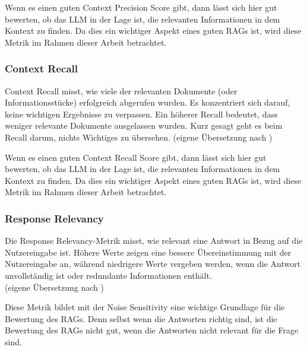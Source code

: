 Wenn es einen guten Context Precision Score gibt, dann lässt sich hier gut bewerten, ob das LLM in der Lage ist, die relevanten Informationen in dem Kontext zu finden.
Da dies ein wichtiger Aspekt eines guten RAGs ist, wird diese Metrik im Rahmen dieser Arbeit betrachtet.

\subsubsection{Context Recall}
\begin{plainquote}
Context Recall misst, wie viele der relevanten Dokumente (oder Informationsstücke) erfolgreich abgerufen wurden.
Es konzentriert sich darauf, keine wichtigen Ergebnisse zu verpassen.
Ein höherer Recall bedeutet, dass weniger relevante Dokumente ausgelassen wurden.
Kurz gesagt geht es beim Recall darum, nichts Wichtiges zu übersehen.
(eigene Übersetzung nach \cite{ragas_context_recall})
\end{plainquote}

Wenn es einen guten Context Recall Score gibt, dann lässt sich hier gut bewerten, ob das LLM in der Lage ist, die relevanten Informationen in dem Kontext zu finden.
Da dies ein wichtiger Aspekt eines guten RAGs ist, wird diese Metrik im Rahmen dieser Arbeit betrachtet.

\subsubsection{Response Relevancy}
\begin{plainquote}
Die Response Relevancy-Metrik misst, wie relevant eine Antwort in Bezug auf die Nutzereingabe ist. Höhere Werte zeigen eine bessere Übereinstimmung mit der Nutzereingabe an, während niedrigere Werte vergeben werden, wenn die Antwort unvollständig ist oder redundante Informationen enthält.\\
(eigene Übersetzung nach \cite{ragas_response_relevancy})
\end{plainquote}

Diese Metrik bildet mit der Noise Sensitivity eine wichtige Grundlage für die Bewertung des RAGs.
Denn selbst wenn die Antworten richtig sind, ist die Bewertung des RAGs nicht gut, wenn die Antworten nicht relevant für die Frage sind.

